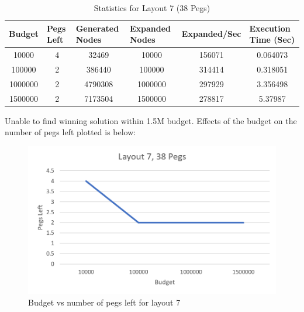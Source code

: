 \documentclass[12pt,a4paper]{article}
\begin{document}
\begin{table}[H]
\caption{Statistics for Layout 7 (38 Pegs)}
\label{tab:my-table}

\begin{tabular}{|c|c|c|c|c|c|}
\hline
Budget  & \multicolumn{1}{l|}{Pegs Left} & \multicolumn{1}{l|}{Generated Nodes} & \multicolumn{1}{l|}{Expanded Nodes} & \multicolumn{1}{l|}{Expanded/Sec} & \multicolumn{1}{l|}{Execution Time (Sec)} \\ \hline
10000   & 4                              & 32469                                & 10000                               & 156071                               & 0.064073                                              \\ \hline
100000  & 2                              & 386440                               & 100000                              & 314414                               & 0.318051                                              \\ \hline
1000000 & 2                              & 4790308                              & 1000000                             & 297929                               & 3.356498                                              \\ \hline
1500000 & 2                              & 7173504                              & 1500000                             & 278817                               & 5.37987                                               \\ \hline
\end{tabular}
\end{table}
Unable to find winning solution within 1.5M budget. Effects of the budget on the number of pegs left plotted is below:

\begin{figure}[H]
\centering
\includegraphics[scale=0.5]{layout7.png}
\caption{Budget vs number of pegs left for layout 7}
\end{figure}
\end{document}
